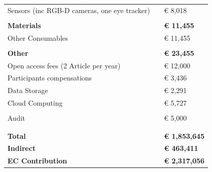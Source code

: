 \documentclass[11pt,a4paper]{report}
\begin{document}
\begin{table}[]
\begin{tabular}{@{}lll@{}}
Sensors (inc RGB-D cameras, one eye tracker)                     &           & € 8,018              \\
                                                                 &           &                      \\
\textbf{Materials}                                               & \textbf{} & \textbf{€ 11,455}    \\ \midrule
Other Consumables                                                &           & € 11,455             \\
                                                                 &           &                      \\
\textbf{Other}                                                   & \textbf{} & \textbf{€ 23,455}    \\ \midrule
Open access fees (2 Article per year)                            &           & € 12,000             \\
Participants compensations                                       &           & € 3,436              \\
Data Storage                                                     &           & € 2,291              \\
Cloud Computing                                                  &           & € 5,727              \\
                                                                 &           &                      \\
Audit                                                            &           & € 5,000              \\
                                                                 &           &                      \\
                                                                 &           &                      \\ \midrule
\textbf{Total}                                                   & \textbf{} & \textbf{€ 1,853,645} \\
\textbf{Indirect}                                                & \textbf{} & \textbf{€ 463,411}   \\
\textbf{EC Contribution}                                         & \textbf{} & \textbf{€ 2,317,056} \\ \bottomrule
\end{tabular}
\end{table}
\end{document}
